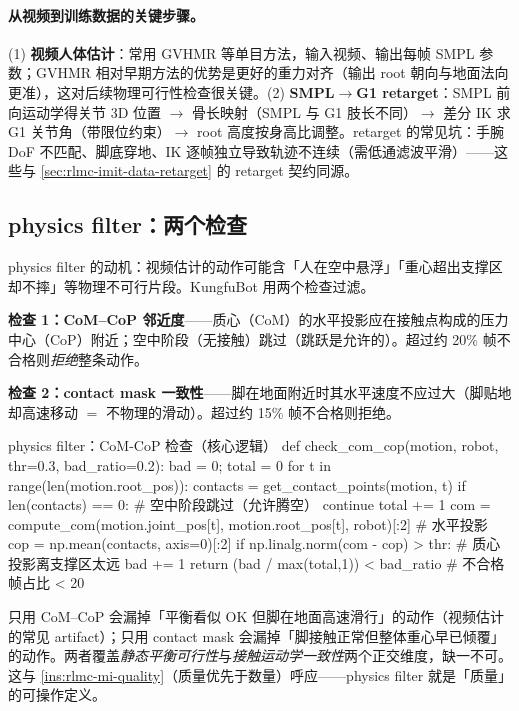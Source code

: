 \paragraph{从视频到训练数据的关键步骤。}(1) \textbf{视频人体估计}：常用 GVHMR 等单目方法，输入视频、输出每帧 SMPL 参数；GVHMR 相对早期方法的优势是更好的重力对齐（输出 root 朝向与地面法向更准），这对后续物理可行性检查很关键。(2) \textbf{SMPL$\to$G1 retarget}：SMPL 前向运动学得关节 3D 位置 $\to$ 骨长映射（SMPL 与 G1 肢长不同）$\to$ 差分 IK 求 G1 关节角（带限位约束）$\to$ root 高度按身高比调整。retarget 的常见坑：手腕 DoF 不匹配、脚底穿地、IK 逐帧独立导致轨迹不连续（需低通滤波平滑）——这些与 \cref{sec:rlmc-imit-data-retarget} 的 retarget 契约同源。

\subsection{physics filter：两个检查}
\label{sec:rlmc-mi-kungfu-filter}

physics filter 的动机：视频估计的动作可能含「人在空中悬浮」「重心超出支撑区却不摔」等物理不可行片段。KungfuBot 用两个检查过滤。

\textbf{检查 1：CoM--CoP 邻近度}——质心（CoM）的水平投影应在接触点构成的压力中心（CoP）附近；空中阶段（无接触）跳过（跳跃是允许的）。超过约 20\% 帧不合格则\emph{拒绝}整条动作。

\textbf{检查 2：contact mask 一致性}——脚在地面附近时其水平速度不应过大（脚贴地却高速移动 $=$ 不物理的滑动）。超过约 15\% 帧不合格则拒绝。

\begin{codebox}[Python]{physics filter：CoM-CoP 检查（核心逻辑）}
def check_com_cop(motion, robot, thr=0.3, bad_ratio=0.2):
    bad = 0; total = 0
    for t in range(len(motion.root_pos)):
        contacts = get_contact_points(motion, t)
        if len(contacts) == 0:                       # 空中阶段跳过（允许腾空）
            continue
        total += 1
        com = compute_com(motion.joint_pos[t], motion.root_pos[t], robot)[:2]  # 水平投影
        cop = np.mean(contacts, axis=0)[:2]
        if np.linalg.norm(com - cop) > thr:          # 质心投影离支撑区太远
            bad += 1
    return (bad / max(total,1)) < bad_ratio          # 不合格帧占比 < 20%
\end{codebox}

\begin{insight}\label{ins:rlmc-mi-filter}
只用 CoM--CoP 会漏掉「平衡看似 OK 但脚在地面高速滑行」的动作（视频估计的常见 artifact）；只用 contact mask 会漏掉「脚接触正常但整体重心早已倾覆」的动作。两者覆盖\emph{静态平衡可行性}与\emph{接触运动学一致性}两个正交维度，缺一不可。这与 \cref{ins:rlmc-mi-quality}（质量优先于数量）呼应——physics filter 就是「质量」的可操作定义。
\end{insight}

